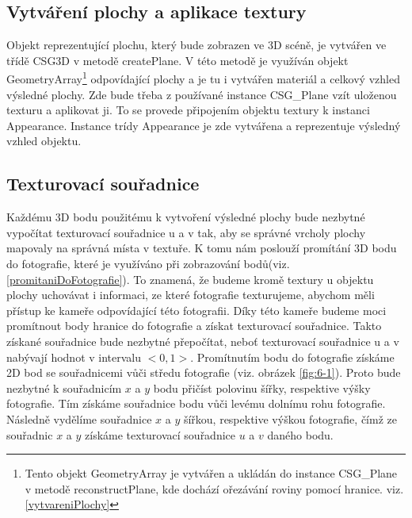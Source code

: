\documentclass[11pt,twoside,a4paper]{book}
\begin{document}
\subsection{Vytváření plochy a aplikace textury}
Objekt reprezentující plochu, který bude zobrazen ve 3D scéně, je vytvářen ve třídě CSG3D v metodě createPlane. V této metodě je využíván objekt GeometryArray\footnote{Tento objekt GeometryArray je vytvářen a ukládán do instance CSG\_Plane v metodě reconstructPlane, kde dochází ořezávání roviny pomocí hranice. viz. \ref{vytvareniPlochy}} odpovídající plochy a je tu i vytvářen materiál a celkový vzhled výsledné plochy. Zde bude třeba z používané instance CSG\_Plane vzít uloženou texturu a aplikovat ji. To se provede připojením objektu textury k instanci Appearance. Instance trídy Appearance je zde vytvářena a reprezentuje výsledný vzhled objektu.

\subsection{Texturovací souřadnice}
\label{texturovacíSouřadnice}
Každému 3D bodu použitému k vytvoření výsledné plochy bude nezbytné vypočítat texturovací souřadnice u a v tak, aby se správné vrcholy plochy mapovaly na správná místa v textuře. K tomu nám poslouží promítání 3D bodu do fotografie, které je využíváno při zobrazování bodů(viz. \ref{promitaniDoFotografie}). To znamená, že budeme kromě textury u objektu plochy uchovávat i informaci, ze které fotografie texturujeme, abychom měli přístup ke kameře odpovídající této fotografii. Díky této kameře budeme moci promítnout body hranice do fotografie a získat texturovací souřadnice. Takto získané souřadnice bude nezbytné přepočítat, neboť texturovací souřadnice u a v nabývají hodnot v intervalu $<0,1>$.  Promítnutím bodu do fotografie získáme 2D bod se souřadnicemi vůči středu fotografie (viz. obrázek \ref{fig:6-1}). Proto bude nezbytné k souřadnicím $x$ a $y$ bodu přičíst polovinu šířky, respektive výšky fotografie. Tím získáme souřadnice bodu vůči levému dolnímu rohu fotografie.  Následně vydělíme souřadnice $x$ a $y$ šířkou, respektive výškou fotografie, čímž ze souřadnic $x$ a $y$ získáme texturovací souřadnice $u$ a $v$ daného bodu. 
\end{document}

